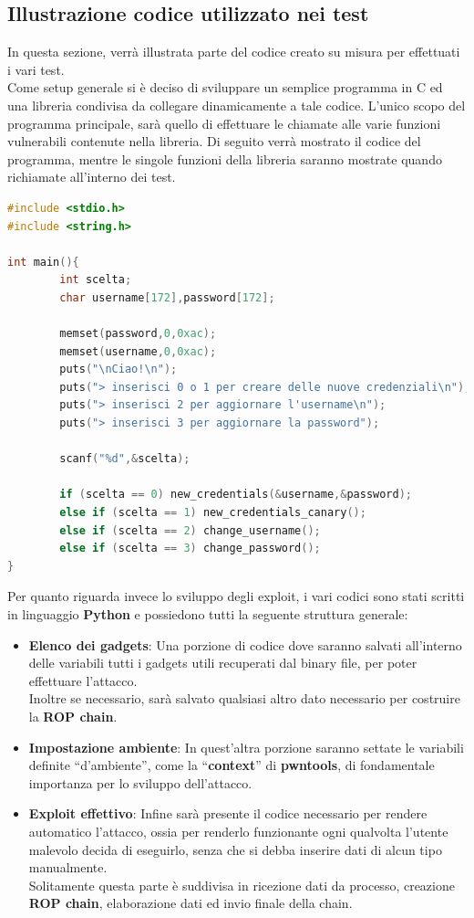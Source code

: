 \subsection*{Illustrazione codice utilizzato nei test}
\label{subsec:Code}
In questa sezione, verrà illustrata parte del codice creato su misura per effettuati i vari test.\\
Come setup generale si è deciso di sviluppare un semplice programma in C ed una libreria condivisa da collegare dinamicamente a tale codice.
L'unico scopo del programma principale, sarà quello di effettuare le chiamate alle varie funzioni vulnerabili contenute nella libreria.
Di seguito verrà mostrato il codice del programma, mentre le singole funzioni della libreria saranno mostrate quando richiamate all'interno dei test.
\begin{lstlisting}[language=C, label=vuln, caption={file .c dell'eseguibile del codice usato come esempio negli attacchi.}, style=C lang]
#include <stdio.h>
#include <string.h>
        
int main(){
        int scelta;
        char username[172],password[172];
        
        memset(password,0,0xac);
        memset(username,0,0xac);
        puts("\nCiao!\n");
        puts("> inserisci 0 o 1 per creare delle nuove credenziali\n");
        puts("> inserisci 2 per aggiornare l'username\n");
        puts("> inserisci 3 per aggiornare la password");
        
        scanf("%d",&scelta);
        
        if (scelta == 0) new_credentials(&username,&password); 
        else if (scelta == 1) new_credentials_canary();
        else if (scelta == 2) change_username();
        else if (scelta == 3) change_password();
}
\end{lstlisting}
Per quanto riguarda invece lo sviluppo degli exploit, i vari codici sono stati scritti in linguaggio \textbf{Python} e possiedono tutti la seguente struttura generale:
\begin{itemize}
      \item \textbf{Elenco dei gadgets}: Una porzione di codice dove saranno salvati all'interno delle variabili tutti i gadgets utili recuperati dal binary file, per poter effettuare l'attacco.\\
            Inoltre se necessario, sarà salvato qualsiasi altro dato necessario per costruire la \textbf{ROP chain}.
      \item \textbf{Impostazione ambiente}: In quest'altra porzione saranno settate le variabili definite ``d'ambiente'', come la ``\textbf{context}'' di \textbf{pwntools}, di fondamentale importanza
            per lo sviluppo dell'attacco.
      \item \textbf{Exploit effettivo}: Infine sarà presente il codice necessario per rendere automatico l'attacco, ossia per renderlo funzionante ogni qualvolta 
            l'utente malevolo decida di eseguirlo, senza che si debba inserire dati di alcun tipo manualmente.\\
            Solitamente questa parte è suddivisa in ricezione dati da processo, creazione \textbf{ROP chain}, elaborazione dati ed invio finale della chain.
\end{itemize}
